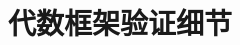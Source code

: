 \documentclass[12pt,a4paper]{article}
\begin{document}


\newpage

\appendix

\section{代数框架验证细节}
\label{app:algebraic_validation}
\end{document}
